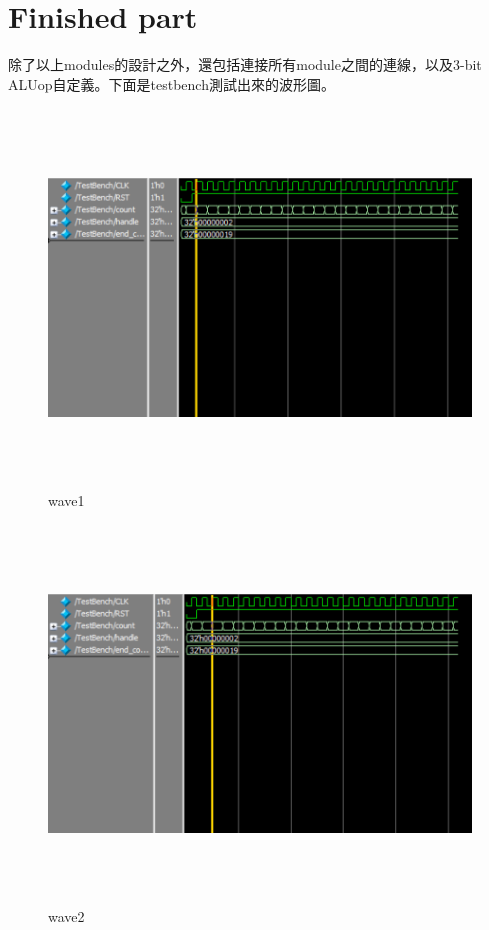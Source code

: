 \documentclass[12pt,a4paper]{article}
\theoremstyle{definition}
\begin{document}
\section{Finished part}

除了以上modules的設計之外，還包括連接所有module之間的連線，以及3-bit ALUop自定義。下面是testbench測試出來的波形圖。

\begin{figure}[H]
\centering
\includegraphics[height=10cm]{fig/res1.png}
\caption{wave1}
\label{fig:archi}
\end{figure}

\begin{figure}[H]
\centering
\includegraphics[height=10cm]{fig/res2.png}
\caption{wave2}
\label{fig:archi}
\end{figure}
\end{document}
